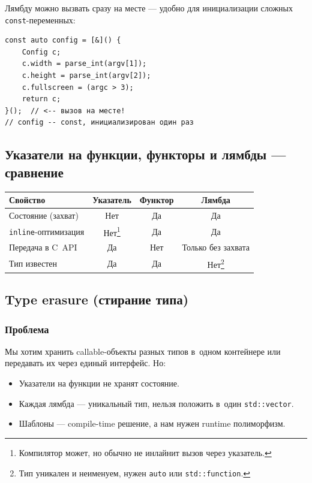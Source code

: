 \documentclass[a4paper,12pt]{article}
\begin{document}
Лямбду можно вызвать сразу на месте --- удобно для инициализации
сложных \texttt{const}-переменных:

\begin{lstlisting}
const auto config = [&]() {
    Config c;
    c.width = parse_int(argv[1]);
    c.height = parse_int(argv[2]);
    c.fullscreen = (argc > 3);
    return c;
}();  // <-- вызов на месте!
// config -- const, инициализирован один раз
\end{lstlisting}

\subsection{Указатели на функции, функторы и лямбды --- сравнение}

\begin{center}
\begin{tabular}{l c c c}
\toprule
\textbf{Свойство} & \textbf{Указатель} & \textbf{Функтор} & \textbf{Лямбда} \\
\midrule
Состояние (захват) & Нет & Да & Да \\
\texttt{inline}-оптимизация & Нет\footnote{Компилятор может, но обычно не инлайнит вызов через указатель.} & Да & Да \\
Передача в C~API & Да & Нет & Только без захвата \\
Тип известен & Да & Да & Нет\footnote{Тип уникален и неименуем, нужен \texttt{auto} или \texttt{std::function}.} \\
\bottomrule
\end{tabular}
\end{center}

\subsection{Type erasure (стирание типа)}

\subsubsection{Проблема}

Мы хотим хранить callable-объекты разных типов в~одном контейнере
или передавать их через единый интерфейс. Но:

\begin{itemize}
    \item Указатели на функции не хранят состояние.
    \item Каждая лямбда --- уникальный тип, нельзя положить в~один \texttt{std::vector}.
    \item Шаблоны --- compile-time решение, а нам нужен runtime полиморфизм.
\end{itemize}
\end{document}

